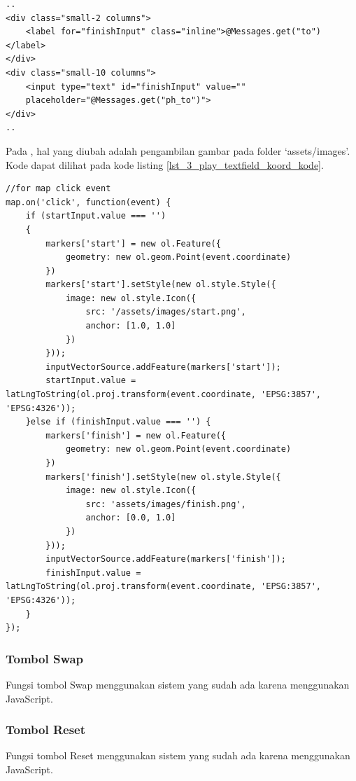 \begin{lstlisting}[caption=Menampilkan \textit{textfield} tempat tujuan kepada pengguna ,label = {lst_3_play_textfield_to}]
..
<div class="small-2 columns">
    <label for="finishInput" class="inline">@Messages.get("to")</label>
</div>
<div class="small-10 columns">
    <input type="text" id="finishInput" value=""
    placeholder="@Messages.get("ph_to")">
</div>
..
\end{lstlisting}
	
Pada \play, hal yang diubah adalah pengambilan gambar pada folder `assets/images'. Kode dapat dilihat pada kode listing \ref{lst_3_play_textfield_koord_kode}.
	
	\begin{lstlisting}[caption=Membuat \textit{event} klik pada peta,label = {lst_3_play_textfield_koord_kode}]
//for map click event
map.on('click', function(event) {
    if (startInput.value === '')
    {
        markers['start'] = new ol.Feature({
            geometry: new ol.geom.Point(event.coordinate)
        })
        markers['start'].setStyle(new ol.style.Style({
            image: new ol.style.Icon({
                src: '/assets/images/start.png',
                anchor: [1.0, 1.0]
            })
        }));
        inputVectorSource.addFeature(markers['start']);
        startInput.value = latLngToString(ol.proj.transform(event.coordinate, 'EPSG:3857', 'EPSG:4326'));
    }else if (finishInput.value === '') {
        markers['finish'] = new ol.Feature({
            geometry: new ol.geom.Point(event.coordinate)
        })
        markers['finish'].setStyle(new ol.style.Style({
            image: new ol.style.Icon({
                src: 'assets/images/finish.png',
                anchor: [0.0, 1.0]
            })
        }));
        inputVectorSource.addFeature(markers['finish']);
        finishInput.value = latLngToString(ol.proj.transform(event.coordinate, 'EPSG:3857', 'EPSG:4326'));
    }
});

\end{lstlisting}

\subsubsection{Tombol Swap}
Fungsi tombol Swap menggunakan sistem yang sudah ada karena menggunakan JavaScript.

\subsubsection{Tombol Reset}
Fungsi tombol Reset menggunakan sistem yang sudah ada karena menggunakan JavaScript.

